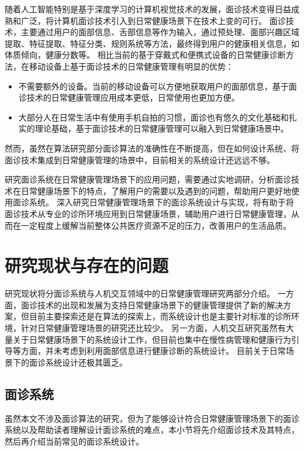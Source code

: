 
随着人工智能特别是基于深度学习的计算机视觉技术\cite{hassaballah2020deep}的发展，面诊技术变得日益成熟和广泛，将计算机面诊技术引入到日常健康场景下在技术上变的可行。
面诊技术，主要通过用户的面部信息、舌部信息等作为输入，通过预处理、面部兴趣区域提取、特征提取、特征分类、规则系统等方法，最终得到用户的健康相关信息，如体质倾向，健康分数等\cite{林锋2019中医面诊系统调研报告}。
相比当前的基于穿戴式和便携式设备的日常健康诊断方法，在移动设备上基于面诊技术的日常健康管理有明显的优势：
\begin{itemize}
    \item 不需要额外的设备。当前的移动设备可以方便地获取用户的面部信息，基于面诊技术的日常健康管理应用成本更低，日常使用也更加方便。
    \item 大部分人在日常生活中有使用手机自拍的习惯，面诊也有悠久的文化基础和扎实的理论基础，基于面诊技术的日常健康管理可以融入到日常健康场景中。
\end{itemize}

然而，虽然在算法研究部分面诊算法的准确性在不断提高，但在如何设计系统、将面诊技术集成到日常健康管理的场景中，目前相关的系统设计还远远不够。

研究面诊系统在日常健康管理场景下的应用问题，需要通过实地调研，分析面诊技术在日常健康场景下的特点，了解用户的需要以及遇到的问题，帮助用户更好地使用面诊系统。
深入研究日常健康管理场景下的面诊系统设计与实现，将有助于将面诊技术从专业的诊所环境应用到日常健康场景，辅助用户进行日常健康管理，从而在一定程度上缓解当前整体公共医疗资源不足的压力，改善用户的生活品质。

\section{研究现状与存在的问题}
研究现状将分面诊系统与人机交互领域中的日常健康管理研究两部分介绍。
一方面，面诊技术的出现和发展为支持日常健康场景下的健康管理提供了新的解决方案，但目前主要探索还是在算法的探索上，而系统设计也是主要针对标准的诊所环境，针对日常健康管理场景的研究还比较少。
另一方面，人机交互研究虽然有大量关于日常健康场景下的系统设计工作，但目前也集中在慢性病管理和健康行为引导等方面，并未考虑到利用面部信息进行健康诊断的系统设计。
目前关于日常场景下的面诊系统设计还极其匮乏。

\subsection{面诊系统}
虽然本文不涉及面诊算法的研究，但为了能够设计符合日常健康管理场景下的面诊系统以及帮助读者理解设计面诊系统的难点，本小节将先介绍面诊技术及其特点，然后再介绍当前常见的面诊系统设计。

